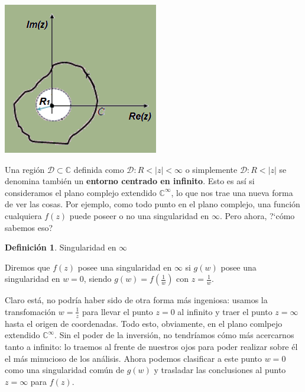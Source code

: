 \documentclass[12pt]{article}
\theoremstyle{definition}
\newtheorem{definition}{Definici\'on}[section]
\theoremstyle{theorem}
\theoremstyle{corolary}
\theoremstyle{method}
\begin{document}
\begin{center}
	\includegraphics[scale=0.9]{entorno_inf.png}
\end{center}

Una regi\'on $\mathcal{D}\subset \mathbb{C}$ definida como $\mathcal{D}: R<|z|<\infty$ o simplemente $\mathcal{D}: R<|z|$ se denomina tambi\'en un \textbf{entorno centrado en infinito}. Esto es as\'i si consideramos el plano complejo extendido $\mathbb{C}^{\infty}$, lo que nos trae una nueva forma de ver las cosas. Por ejemplo, como todo punto en el plano complejo, una funci\'on cualquiera $f(z)$ puede poseer o no una singularidad en $\infty$. Pero ahora, ?`c\'omo sabemos eso?

\colorbox{green!40!white!80}{\parbox{\linewidth}{
\theoremstyle{definition}
\begin{definition}{Singularidad en $\infty$}

Diremos que $f(z)$ posee una singularidad en $\infty$ si $g(w)$ posee una singularidad en $w=0$, siendo $g(w)=f\left(\frac{1}{w}\right)$ con $z=\frac{1}{w}$.
\end{definition}}}
\linebreak
\linebreak

Claro est\'a, no podr\'ia haber sido de otra forma m\'as ingeniosa: usamos la transfomaci\'on $w=\frac{1}{z}$ para llevar el punto $z=0$ al infinito y traer el punto $z=\infty$ hasta el origen de coordenadas. Todo esto, obviamente, en el plano comlpejo extendido $\mathbb{C}^{\infty}$. Sin el poder de la inversi\'on, no tendr\'iamos c\'omo m\'as acercarnos tanto a infinito: lo traemos al frente de nuestros ojos para poder realizar sobre \'el el m\'as minucioso de los an\'alisis. Ahora podemos clasificar a este punto $w=0$ como una singularidad com\'un de $g(w)$ y trasladar las conclusiones al punto $z=\infty$ para $f(z)$.
\end{document}
